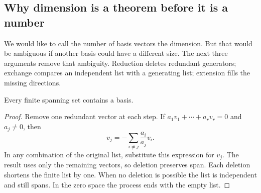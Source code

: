 \subsection{Why dimension is a theorem before it is a number}
We would like to call the number of basis vectors the dimension. But that
would be ambiguous if another basis could have a different size. The next
three arguments remove that ambiguity. Reduction deletes redundant
generators; exchange compares an independent list with a generating list;
extension fills the missing directions.
\begin{lemma}
\label{lem:basis-reduction}
Every finite spanning set contains a basis.
\end{lemma}
\begin{proof}
Remove one redundant vector at each step.
If $a_1v_1+\cdots+a_rv_r=0$ and $a_j\ne0$, then
\[
v_j=-\sum_{i\ne j}\frac{a_i}{a_j}v_i.
\]
In any combination of the original list, substitute this expression for
$v_j$. The result uses only the remaining vectors, so deletion preserves
span. Each deletion shortens the finite list by one. When no deletion is
possible the list is independent and still spans. In the zero space the
process ends with the empty list.
\end{proof}

